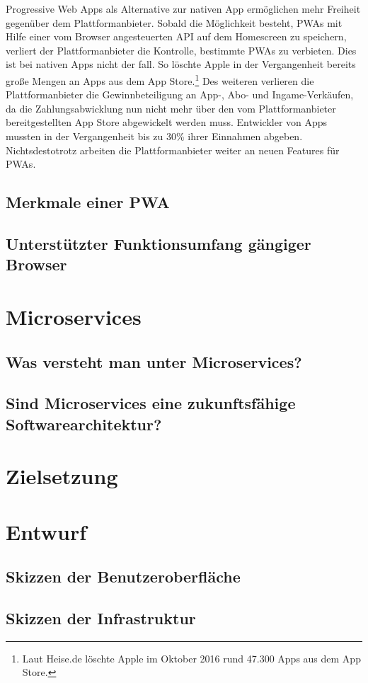 Progressive Web Apps als Alternative zur nativen App ermöglichen mehr Freiheit gegenüber dem
Plattformanbieter. Sobald die Möglichkeit besteht, PWAs mit Hilfe einer vom Browser angesteuerten API
auf dem Homescreen zu speichern, verliert der Plattformanbieter die Kontrolle,
bestimmte PWAs zu verbieten. Dies ist bei nativen Apps nicht der fall. So löschte Apple in der Vergangenheit
bereits große Mengen an Apps aus dem App Store.\footnote[1]{Laut Heise.de löschte Apple im Oktober 2016 rund 47.300 Apps aus dem App Store.\cite{HeiseAppleLoeschtApps}} 
Des weiteren verlieren die Plattformanbieter die Gewinnbeteiligung an App-, Abo- und Ingame-Verkäufen,
da die Zahlungsabwicklung nun nicht mehr über den vom Plattformanbieter bereitgestellten App Store
abgewickelt werden muss. Entwickler von Apps mussten in der Vergangenheit bis zu 30\% 
ihrer Einnahmen abgeben. \cite{WinFutureEigenerAppStore} Nichtsdestotrotz arbeiten
die Plattformanbieter weiter an neuen Features für PWAs.


\subsection{Merkmale einer PWA}

\subsection{Unterstützter Funktionsumfang gängiger Browser}

\section{Microservices}

\subsection{Was versteht man unter Microservices?}

\subsection{Sind Microservices eine zukunftsfähige Softwarearchitektur?}

\section{Zielsetzung}

\section{Entwurf}

\subsection{Skizzen der Benutzeroberfläche}
\subsection{Skizzen der Infrastruktur}
